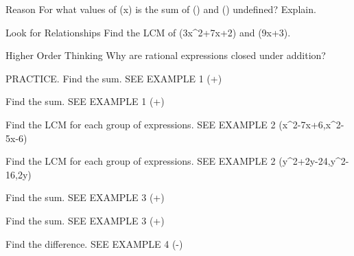 \documentclass{article}
\newenvironment{practice}[2]{}{}        %
\newcommand{\answer}[1]{}               %
\newcommand{\te}[1]{}                   %
\begin{document}
\begin{practice}{15}{2}
Reason For what values of (x) is the sum of () and () undefined? Explain.
\answer{When (x=-y), the denominator is zero, which is undefined.}
\end{practice}
\begin{practice}{16}{2}
Look for Relationships Find the LCM of (3x^2+7x+2) and (9x+3).
\answer{(3(3x+1)(x+2))}
\end{practice}
\begin{practice}{17}{2}
Higher Order Thinking Why are rational expressions closed under addition?
\answer{You can find the sum of two rational expressions (\frac{p(x)}{q(x)}+\frac{r(x)}{t(x)}) by finding the sum of equivalent expressions, (\frac{p(x)\cdot t(x)}{q(x)\cdot t(x)}+\frac{r(x)\cdot q(x)}{t(x)\cdot q(x)}=\frac{p(x)\cdot t(x)+r(x)\cdot q(x)}{q(x)\cdot t(x)}). Since the numerator and denominator are still polynomials, the sum is a rational expression. So rational expressions are closed under addition.}
\te{Answer printed on PDF page 56, printed page 211.}
\end{practice}
\begin{practice}{18}{1}
PRACTICE. Find the sum. SEE EXAMPLE 1
(+)
\answer{(\frac{4x+9}{x+7})}
\end{practice}
\begin{practice}{19}{1}
Find the sum. SEE EXAMPLE 1
(+)
\answer{(\frac{12y+5}{y^2+4y})}
\end{practice}
\begin{practice}{20}{1}
Find the LCM for each group of expressions. SEE EXAMPLE 2
(x^2-7x+6,x^2-5x-6)
\answer{((x-6)(x+1)(x-1))}
\end{practice}
\begin{practice}{21}{1}
Find the LCM for each group of expressions. SEE EXAMPLE 2
(y^2+2y-24,y^2-16,2y)
\answer{(2y(y+6)(y+4)(y-4))}
\end{practice}
\begin{practice}{22}{1}
Find the sum. SEE EXAMPLE 3
(+)
\answer{(\frac8{x-8})}
\end{practice}
\begin{practice}{23}{1}
Find the sum. SEE EXAMPLE 3
(+)
\answer{(\frac{5y-1}{y(2y-1)})}
\end{practice}
\begin{practice}{24}{1}
Find the difference. SEE EXAMPLE 4
(-)
\answer{(\frac{-4}{(x+1)(x-1)})}
\end{practice}
\end{document}
